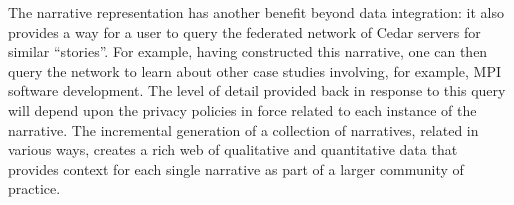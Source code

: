 The narrative representation has another benefit beyond data integration:
it also provides a way for a user to query the federated network of Cedar
servers for similar ``stories''.  For example, having constructed this
narrative, one can then query the network to learn about other case studies
involving, for example, MPI software development.  The level of detail
provided back in response to this query will depend upon the privacy
policies in force related to each instance of the narrative. The
incremental generation of a collection of narratives, related in various
ways, creates a rich web of qualitative and quantitative data that provides
context for each single narrative as part of a larger community of
practice.





















